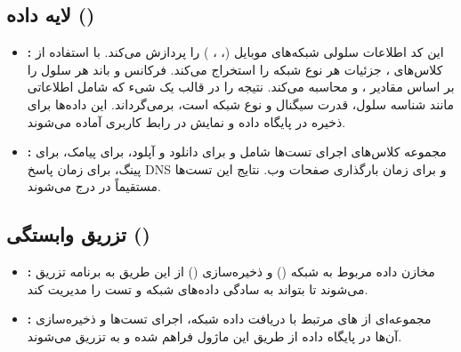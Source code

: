 \subsection{لایه داده ()}
\begin{itemize}
    \item \textbf{:}  
    این کد اطلاعات سلولی شبکه‌های موبایل (، ، ) را پردازش می‌کند.  
    با استفاده از کلاس‌های ، جزئیات هر نوع شبکه را استخراج می‌کند.  
    فرکانس و باند هر سلول را بر اساس مقادیر ،  و  محاسبه می‌کند.  
    نتیجه را در قالب یک شیء  که شامل اطلاعاتی مانند شناسه سلول، قدرت سیگنال و نوع شبکه است، برمی‌گرداند. این داده‌ها برای ذخیره در پایگاه داده و نمایش در رابط کاربری آماده می‌شوند.

    \item \textbf{:}  
    مجموعه کلاس‌های اجرای تست‌ها شامل  و  برای دانلود و آپلود،  برای پیامک،  برای پینگ،  برای زمان پاسخ DNS و  برای زمان بارگذاری صفحات وب. نتایج این تست‌ها مستقیماً در  درج می‌شوند.
\end{itemize}

\subsection{تزریق وابستگی ()}
\begin{itemize}
    \item \textbf{:}  
    مخازن داده مربوط به شبکه () و ذخیره‌سازی () از این طریق به برنامه تزریق می‌شوند تا  بتواند به سادگی داده‌های شبکه و تست را مدیریت کند.
    
    \item \textbf{:}  
    مجموعه‌ای از ‌های مرتبط با دریافت داده شبکه، اجرای تست‌ها و ذخیره‌سازی آن‌ها در پایگاه داده از طریق این ماژول فراهم شده و به  تزریق می‌شوند.
\end{itemize}

